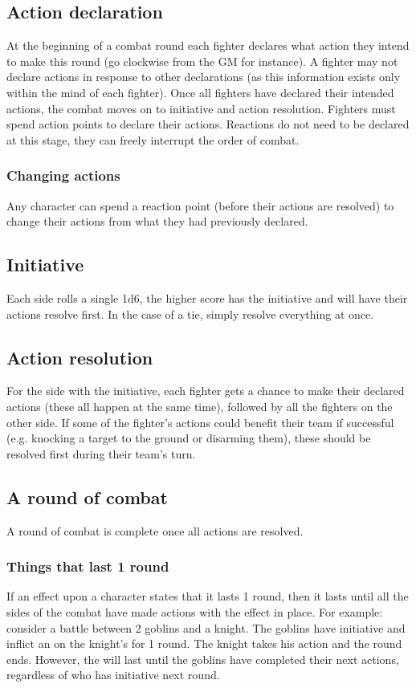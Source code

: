 \documentclass[a4paper,10pt,oneside]{book}
\newcommand{\textlf}[1]{\textbf{\titlecap{#1}}}
\begin{document}
\subsection{Action declaration}
At the beginning of a combat round each fighter declares what action they intend to make this round (go clockwise from the GM for instance). A fighter may not declare actions in response to other declarations (as this information exists only within the mind of each fighter). Once all fighters have declared their intended actions, the combat moves on to initiative and action resolution. Fighters must spend action points to declare their actions. Reactions do not need to be declared at this stage, they can freely interrupt the order of combat.

\subsubsection{Changing actions}
Any character can spend a reaction point (before their actions are resolved) to change their actions from what they had previously declared. 

\subsection{Initiative}
Each side rolls a single 1d6, the higher score has the initiative and will have their actions resolve first. In the case of a tie, simply resolve everything at once.

\subsection{Action resolution}
For the side with the initiative, each fighter gets a chance to make their declared actions (these all happen at the same time), followed by all the fighters on the other side. If some of the fighter's actions could benefit their team if successful (e.g. knocking a target to the ground or disarming them), these should be resolved first during their team's turn.

\subsection{A round of combat}
A round of combat is complete once all actions are resolved. 

\subsubsection{Things that last 1 round}
If an effect upon a character states that it lasts 1 round, then it lasts until all the sides of the combat have made actions with the effect in place. For example: consider a battle between 2 goblins and a knight. The goblins have initiative and inflict an \textlf{edge-} on the knight's \textlf{deflect} for 1 round. The knight takes his action and the round ends. However, the \textlf{edge-} will last until the goblins have completed their next actions, regardless of who has initiative next round.    
\end{document}
